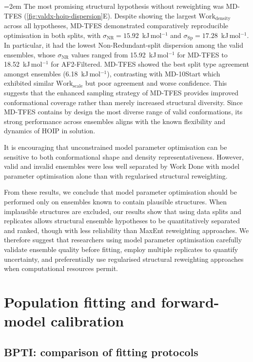{\emergencystretch=2em The most promising structural hypothesis without reweighting was MD-TFES (\cref{fig:valdx-hoip-dispersion}E). Despite showing the largest $\text{Work}_\text{density}$ across all hypotheses, MD-TFES demonstrated comparatively reproducible optimisation in both splits, with $\sigma_{\mathrm{NR}}=15.92$~kJ\,mol$^{-1}$ and $\sigma_{\mathrm{Sp}}=17.28$~kJ\,mol$^{-1}$. In particular, it had the lowest Non-Redundant-split dispersion among the valid ensembles, whose $\sigma_{\mathrm{NR}}$ values ranged from 15.92~kJ\,mol$^{-1}$ for MD-TFES to 18.52~kJ\,mol$^{-1}$ for AF2-Filtered. MD-TFES showed the best split type agreement amongst ensembles (6.18~kJ\,mol$^{-1}$), contrasting with MD-10Start which exhibited similar $\text{Work}_\text{scale}$ but poor agreement and worse confidence. This suggests that the enhanced sampling strategy of MD-TFES provides improved conformational coverage rather than merely increased structural diversity. Since MD-TFES contains by design the most diverse range of valid conformations, its strong performance across ensembles aligns with the known flexibility and dynamics of HOIP in solution.\par}

It is encouraging that unconstrained model parameter optimisation can be sensitive to both conformational shape and density representativeness. However, valid and invalid ensembles were less well separated by Work Done with model parameter optimisation alone than with regularised structural reweighting.

From these results, we conclude that model parameter optimisation should be performed only on ensembles known to contain plausible structures. When implausible structures are excluded, our results show that using data splits and replicates allows structural ensemble hypotheses to be quantitatively separated and ranked, though with less reliability than MaxEnt reweighting approaches. We therefore suggest that researchers using model parameter optimisation carefully validate ensemble quality before fitting, employ multiple replicates to quantify uncertainty, and preferentially use regularised structural reweighting approaches when computational resources permit.

\section{Population fitting and forward-model calibration}
\label{sec:valdx-calibration}

\subsection{BPTI: comparison of fitting protocols}
\label{sec:valdx-protocol-comparison}

